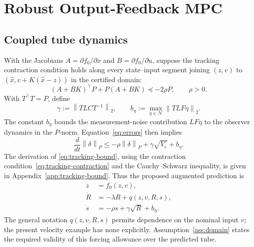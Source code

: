 \documentclass[11pt,a4paper]{article}
\numberwithin{equation}{section}
\theoremstyle{remark}\newtheorem{remark}{Remark}
\newcommand{\norm}[1]{\left\lVert#1\right\rVert}
\begin{document}
\section{Robust Output-Feedback MPC}
\subsection{Coupled tube dynamics}
With the Jacobians $A=\partial f_0/\partial x$ and $B=\partial f_0/\partial u$, suppose the tracking contraction condition holds along every state--input segment joining $(z,v)$ to $(\hat x,v+K(\hat x-z))$ in the certified domain:
\begin{equation}
(A+BK)^\top P+P(A+BK)\preceq-2\rho P,\qquad\rho>0.\label{eq:tracking-contraction}
\end{equation}
With $T^\top T=P$, define
\[
\gamma:=\norm{TLC T^{-1}}_2,\qquad
b_\eta:=\max_{\eta\in\mathcal N}\norm{TLF\eta}_2.
\]
The constant $b_\eta$ bounds the measurement-noise contribution $LF\eta$ to the observer dynamics in the $P$-norm. Equation~\eqref{eq:errors} then implies
\begin{equation}
\frac{d}{dt}\norm\delta_P\le-\rho\norm\delta_P+\gamma\sqrt{V_e}+b_\eta.\label{eq:tracking-bound}
\end{equation}
The derivation of \eqref{eq:tracking-bound}, using the contraction condition~\eqref{eq:tracking-contraction} and the Cauchy--Schwarz inequality, is given in Appendix~\ref{app:tracking-bound}. Thus the proposed augmented prediction is
\begin{subequations}\label{eq:tubes}
\begin{align}
\dot z&=f_0(z,v),\\
\dot R&=-\lambda R+q(z,v,R,s),\\
\dot s&=-\rho s+\gamma\sqrt R+b_\eta.\label{eq:tracking-radius}
\end{align}
\end{subequations}
The general notation $q(z,v,R,s)$ permits dependence on the nominal input $v$; the present velocity example has none explicitly. Assumption~\ref{ass:domain} states the required validity of this forcing allowance over the predicted tube.
\end{document}
